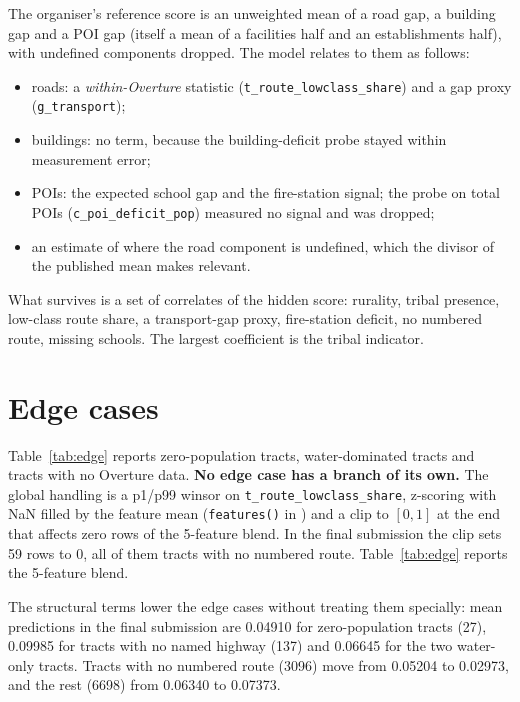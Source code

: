 \documentclass[a4paper]{article}
\newcommand{\Ftrans}{\texttt{g\_transport}}
\newcommand{\Froute}{\texttt{t\_route\_lowclass\_share}}
\newcommand{\Fpoi}{\texttt{c\_poi\_deficit\_pop}}
\begin{document}
The organiser's reference score is an unweighted mean of a road gap, a building gap and a POI
gap (itself a mean of a facilities half and an establishments half), with undefined
components dropped. The model relates to them as follows:

\begin{itemize}
\item roads: a \emph{within-Overture} statistic (\Froute) and a gap proxy (\Ftrans);
\item buildings: no term, because the building-deficit probe stayed within measurement error;
\item POIs: the expected school gap and the fire-station signal; the probe on total POIs (\Fpoi) measured no
signal and was dropped;
\item an estimate of where the road component is undefined, which the divisor of the published mean
makes relevant.
\end{itemize}

What survives is a set of correlates of the hidden score: rurality, tribal presence,
low-class route share, a transport-gap proxy, fire-station deficit, no numbered route, missing schools. The
largest coefficient is the tribal indicator.

\section{Edge cases}
\label{sec:edge}

Table~\ref{tab:edge} reports zero-population tracts, water-dominated tracts and tracts with no Overture data.
\textbf{No edge case has a branch of its own.} The global handling is a p1/p99 winsor on \Froute, z-scoring
with NaN filled by the feature mean (\texttt{features()} in ) and a clip to
$[0,1]$ at the end that affects zero rows of the 5-feature blend. In the final submission the clip sets 59 rows to
0, all of them tracts with no numbered route. Table~\ref{tab:edge} reports the 5-feature blend.

\begin{table}[htbp]
\centering
\caption{Edge cases: counts, prediction levels relative to the global mean of \num{0.05981}, and
the treatment each one receives.}
\label{tab:edge}
\footnotesize\setlength{\tabcolsep}{3pt}

\end{table}

The structural terms lower the edge cases without treating them specially: mean predictions in the
final submission are \num{0.04910} for zero-population tracts (27), \num{0.09985} for tracts with no named
highway (137) and \num{0.06645} for the two water-only tracts. Tracts with no numbered route (\num{3096})
move from \num{0.05204} to \num{0.02973}, and the rest (\num{6698}) from \num{0.06340} to \num{0.07373}.
\end{document}
